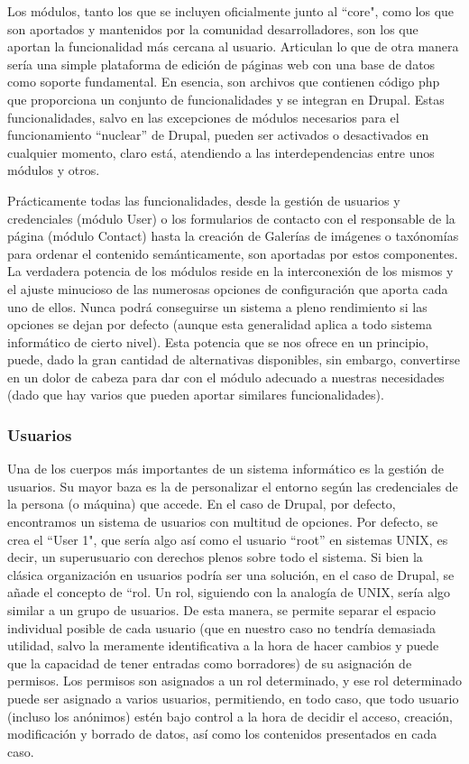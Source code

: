 \par Los módulos, tanto los que se incluyen oficialmente junto al ``core", como los que son aportados y mantenidos por la comunidad desarrolladores, son los que aportan la funcionalidad más cercana al usuario. Articulan lo que de otra manera sería una simple plataforma de edición de páginas web con una base de datos como soporte fundamental.
En esencia, son archivos que contienen código php que proporciona un conjunto de funcionalidades y se integran en Drupal. Estas funcionalidades, salvo en las excepciones de módulos necesarios para el funcionamiento ``nuclear'' de Drupal, pueden ser activados o desactivados en cualquier momento, claro está, atendiendo a las interdependencias entre unos módulos y otros.
\par Prácticamente todas las funcionalidades, desde la gestión de usuarios y credenciales (módulo User) o los formularios de contacto con el responsable de la página (módulo Contact) hasta la creación de Galerías de imágenes o taxónomías para ordenar el contenido semánticamente, son aportadas por estos componentes.
La verdadera potencia de los módulos reside en la interconexión de los mismos y el ajuste minucioso de las numerosas opciones de configuración que aporta cada uno de ellos. Nunca podrá conseguirse un sistema a pleno rendimiento si las opciones se dejan por defecto (aunque esta generalidad aplica a todo sistema informático de cierto nivel). Esta potencia que se nos ofrece en un principio, puede, dado la gran cantidad de alternativas disponibles, sin embargo, convertirse en un dolor de cabeza para dar con el módulo adecuado a nuestras necesidades (dado que hay varios que pueden aportar similares funcionalidades).

\subsubsection{Usuarios} 

\par Una de los cuerpos más importantes de un sistema informático es la gestión de usuarios. Su mayor baza es la de personalizar el entorno según las credenciales de la persona (o máquina) que accede. En el caso de Drupal, por defecto, encontramos un sistema de usuarios con multitud de opciones. Por defecto, se crea el ``User 1", que sería algo así como el usuario ``root'' en sistemas UNIX, es decir, un superusuario con derechos plenos sobre todo el sistema.
Si bien la clásica organización en usuarios podría ser una solución, en el caso de Drupal, se añade el concepto de ``rol. Un rol, siguiendo con la analogía de UNIX, sería algo similar a un grupo de usuarios. De esta manera, se permite separar el espacio individual posible de cada usuario (que en nuestro caso no tendría demasiada utilidad, salvo la meramente identificativa a la hora de hacer cambios y puede que la capacidad de tener entradas como borradores) de su asignación de permisos.
Los permisos son asignados a un rol determinado, y ese rol determinado puede ser asignado a varios usuarios, permitiendo, en todo caso, que todo usuario (incluso los anónimos) estén bajo control a la hora de decidir el acceso, creación, modificación y borrado de datos, así como los contenidos presentados en cada caso.

